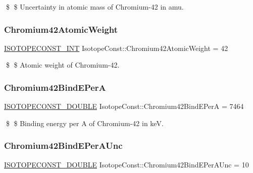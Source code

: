 \$ \$ Uncertainty in atomic mass of Chromium-\/42 in amu. \mbox{\label{group___isotope_const-_chromium-_cr42_ga0eb0e8f5f4665b2de04b8f25bdcaeb79}} 
\subsubsection{\texorpdfstring{Chromium42\+Atomic\+Weight}{Chromium42AtomicWeight}}
{\footnotesize\ttfamily \mbox{\hyperlink{group___isotope_const-_macros_ga5f18360b3e99483a35c32d789e62621c}{I\+S\+O\+T\+O\+P\+E\+C\+O\+N\+S\+T\+\_\+\+I\+NT}} Isotope\+Const\+::\+Chromium42\+Atomic\+Weight = 42}

\$ \$ Atomic weight of Chromium-\/42. \mbox{\label{group___isotope_const-_chromium-_cr42_ga91afd1f19ba5a98f759184d0fb9fc526}} 
\subsubsection{\texorpdfstring{Chromium42\+Bind\+E\+PerA}{Chromium42BindEPerA}}
{\footnotesize\ttfamily \mbox{\hyperlink{group___isotope_const-_macros_ga8f45a7272ce02c0b4c65c44636ed719a}{I\+S\+O\+T\+O\+P\+E\+C\+O\+N\+S\+T\+\_\+\+D\+O\+U\+B\+LE}} Isotope\+Const\+::\+Chromium42\+Bind\+E\+PerA = 7464}

\$ \$ Binding energy per A of Chromium-\/42 in keV. \mbox{\label{group___isotope_const-_chromium-_cr42_ga5d2e797d342b838d27bd7a0a9735b1d1}} 
\subsubsection{\texorpdfstring{Chromium42\+Bind\+E\+Per\+A\+Unc}{Chromium42BindEPerAUnc}}
{\footnotesize\ttfamily \mbox{\hyperlink{group___isotope_const-_macros_ga8f45a7272ce02c0b4c65c44636ed719a}{I\+S\+O\+T\+O\+P\+E\+C\+O\+N\+S\+T\+\_\+\+D\+O\+U\+B\+LE}} Isotope\+Const\+::\+Chromium42\+Bind\+E\+Per\+A\+Unc = 10}

